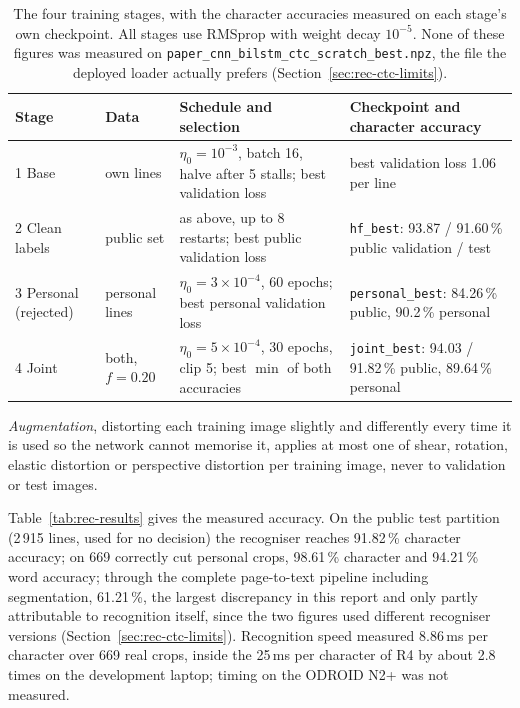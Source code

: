 \begin{table}[h]
\centering
\fontsize{8.5}{10.2}\selectfont
\setlength{\tabcolsep}{4pt}
\begin{tabularx}{\linewidth}{|p{1.8cm}|p{1.4cm}|X|p{3.4cm}|}
\hline
\textbf{Stage} & \textbf{Data} & \textbf{Schedule and selection} & \textbf{Checkpoint and character accuracy} \\
\hline
1 Base & own lines & $\eta_0=10^{-3}$, batch 16, halve after 5 stalls; best validation loss & best validation loss 1.06 per line \\
\hline
2 Clean labels & public set & as above, up to 8 restarts; best public validation loss & \texttt{hf\_best}: 93.87 / 91.60\,\% public validation / test \\
\hline
3 Personal (rejected) & personal lines & $\eta_0=3\times10^{-4}$, 60 epochs; best personal validation loss & \texttt{personal\_best}: 84.26\,\% public, 90.2\,\% personal \\
\hline
4 Joint & both, $f=0.20$ & $\eta_0=5\times10^{-4}$, 30 epochs, clip 5; best $\min$ of both accuracies & \texttt{joint\_best}: 94.03 / 91.82\,\% public, 89.64\,\% personal \\
\hline
\end{tabularx}
\caption{The four training stages, with the character accuracies measured on each stage's own checkpoint. All stages use RMSprop with weight decay $10^{-5}$. None of these figures was measured on \texttt{paper\_cnn\_bilstm\_ctc\_scratch\_best.npz}, the file the deployed loader actually prefers (Section~\ref{sec:rec-ctc-limits}).}
\label{tab:rec-stages}
\end{table}

\emph{Augmentation}, distorting each training image slightly and differently every time it is used so the network cannot memorise it, applies at most one of shear, rotation, elastic distortion or perspective distortion per training image, never to validation or test images.

Table~\ref{tab:rec-results} gives the measured accuracy. On the public test partition (2\,915 lines, used for no decision) the recogniser reaches 91.82\,\% character accuracy; on 669 correctly cut personal crops, 98.61\,\% character and 94.21\,\% word accuracy; through the complete page-to-text pipeline including segmentation, 61.21\,\%, the largest discrepancy in this report and only partly attributable to recognition itself, since the two figures used different recogniser versions (Section~\ref{sec:rec-ctc-limits}). Recognition speed measured 8.86\,ms per character over 669 real crops, inside the 25\,ms per character of R4 by about 2.8 times on the development laptop; timing on the ODROID N2+ was not measured. 

